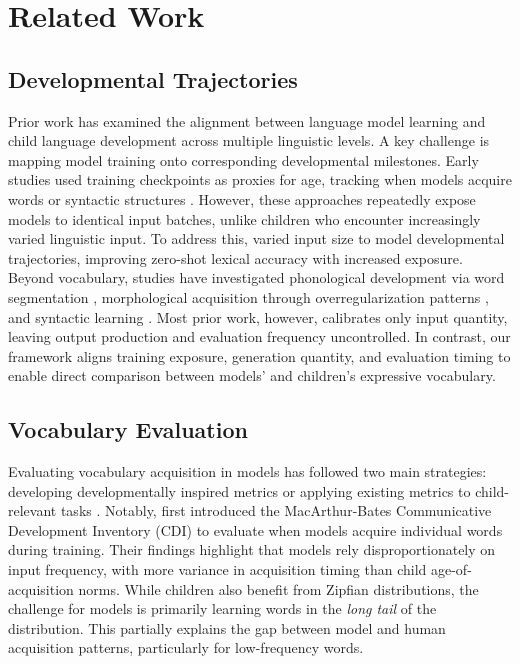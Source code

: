 


\section{Related Work}

\subsection{Developmental Trajectories}

Prior work has examined the alignment between language model learning and child language development across multiple linguistic levels. A key challenge is mapping model training onto corresponding developmental milestones. Early studies used training checkpoints as proxies for age, tracking when models acquire words \citep{chang2022word} or syntactic structures \citep{evanson2023language}. However, these approaches repeatedly expose models to identical input batches, unlike children who encounter increasingly varied linguistic input. To address this, \citet{lavechin2023babyslm} varied input size to model developmental trajectories, improving zero-shot lexical accuracy with increased exposure. Beyond vocabulary, studies have investigated phonological development via word segmentation \citep{goriely2024babble}, morphological acquisition through overregularization patterns \citep{haga2024modeling}, and syntactic learning \citep{evanson2023language}. Most prior work, however, calibrates only input quantity, leaving output production and evaluation frequency uncontrolled. In contrast, our framework aligns training exposure, generation quantity, and evaluation timing to enable direct comparison between models' and children's expressive vocabulary.

\subsection{Vocabulary Evaluation}

Evaluating vocabulary acquisition in models has followed two main strategies: developing developmentally inspired metrics or applying existing metrics to child-relevant tasks \citep{kosoy2023comparing,nikolaus2021evaluating,jiang2023mewl}. Notably, \citet{chang2022word} first introduced the MacArthur-Bates Communicative Development Inventory (CDI) to evaluate when models acquire individual words during training. Their findings highlight that models rely disproportionately on input frequency, with more variance in acquisition timing than child age-of-acquisition norms. While children also benefit from Zipfian distributions, the challenge for models is primarily learning words in the \emph{long tail} of the distribution\citep{wolters2024zipfian,lavi2023zipfian,lavi2022learnability}. This partially explains the gap between model and human acquisition patterns, particularly for low-frequency words. 

